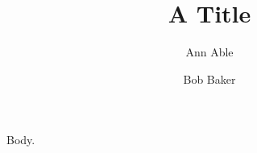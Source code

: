 \documentclass{article}
\begin{document}
\title{A Title}
\author[\dag a]{Ann Able}
\author[\ddag b]{Bob Baker}
\maketitle
Body.
\end{document}
